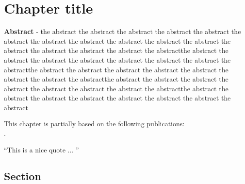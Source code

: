 \chapter{Chapter title}
\label{ch:reference}

\newpage

\thispagestyle{empty}

\normalsize

\begin{center}

\begin{minipage}{30em}
\vspace{5em}

\textbf{Abstract} - the abstract the abstract the abstract the abstract the abstract the abstract the abstract the abstract the abstract the abstract the abstract the abstract the abstract the abstract the abstract the abstractthe abstract the abstract the abstract the abstract the abstract the abstract the abstract the abstractthe abstract the abstract the abstract the abstract the abstract the abstract the abstract the abstractthe abstract the abstract the abstract the abstract the abstract the abstract the abstract the abstractthe abstract the abstract the abstract the abstract the abstract the abstract the abstract the abstract

\end{minipage}

\end{center}

\vfill

\begin{small}
\noindent This chapter is partially based on the following publications:\\[1.3ex] 
\noindent{}.\\[1.3ex]
\end{small}
\newpage

\pagestyle{default}

\begin{flushright}
\begin{minipage}{16em}
\flushleft
\footnotesize``This is a nice quote ... ''
\flushright
\textbf{\citet{Anonymous}}
\end{minipage}
\end{flushright}

\section{Section}
\label{sec:label}

